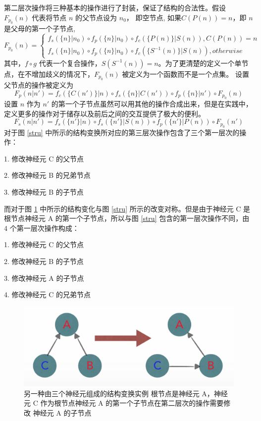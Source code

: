 第二层次操作将三种基本的操作进行了封装，保证了结构的合法性。假设 $F_{p_0}(n)$ 代表将节点 $n$ 的父节点设为 $n_0$， 即空节点, 如果$C(P(n)) = n$，即 $n$ 是父母的第一个子节点,
$$
F_{p_0}(n) =
\left\{
\begin{aligned}
f_s(\{n\} | n_0) \circ f_p(\{n\} | n_0) \circ f_c(\{P(n)\} | S(n)), C(P(n)) = n\\
f_s(\{n\} | n_0) \circ f_p(\{n\} | n_0) \circ f_c(\{S^{-1}(n)\} | S(n)), otherwise
\end{aligned}
\right.
$$
其中，$f \circ g$ 代表一个复合操作，$S(S^{-1}(n)) = n$。为了更清楚的定义一个单节点，在不增加歧义的情况下，$F_{p_0}(n)$ 被定义为一个函数而不是一个点集。
设置父节点的操作被定义为
$$F_p(n|n') = f_c(\{C(n')\}|n) \circ f_s(\{n\}|C(n'))  \circ f_p(\{n\}|n') \circ F_{p_0}(n)$$
设置 $n$ 作为 $n{}'$ 的第一个子节点虽然可以用其他的操作合成出来，但是在实践中，定义更多的操作对于储存以及前后之间的交互提供了极大的便利。
$$F_s(n|n') = f_s(\{n'\}|n) \circ f_s(\{n'\}|S(n))  \circ f_p(\{n'\}|P(n)) \circ F_{p_0}(n')$$
对于图 \ref{stru} 中所示的结构变换所对应的第三层次操作包含了三个第一层次的操作：

1. 修改神经元 C 的父节点

2. 修改神经元 B 的兄弟节点

3. 修改神经元 B 的子节点

而对于图 \ref{stru2} 中所示的结构变化与图 \ref{stru} 所示的改变对称。但是由于神经元 C 是根节点神经元 A 的第一个子节点，所以与图 \ref{stru} 包含的第一层次操作不同，由 4 个第一层次操作构成：

1. 修改神经元 C 的父节点

2. 修改神经元 B 的子节点

3. 修改神经元 A 的子节点

4. 修改神经元 C 的兄弟节点

\begin{figure}[!ht]
\centering
\includegraphics[width=148mm]{images/stru2}
\caption{另一种由三个神经元组成的结构变换实例 根节点是神经元 A，神经元 C 作为根节点神经元 A 的第一个子节点在第二层次的操作需要修改 神经元 A 的子节点}
\label{stru2}
\end{figure}

